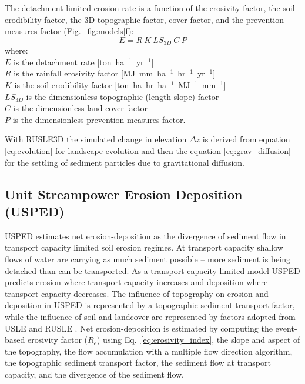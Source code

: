 \documentclass[gmd, manuscript]{copernicus}
\begin{document}
The detachment limited erosion rate is a function of the erosivity factor, 
the soil erodibility factor, the 3D topographic factor, 
cover factor, and the prevention measures factor 
(Fig.~\ref{fig:models}f):
%
\begin{equation}
\label{eq:rusle}
{E = R ~ K ~ LS_{3D} ~ C ~ P}
\end{equation}
%
{\small
\noindent
where: \\
\noindent
\hspace*{0.5em} $E$ is the detachment rate [\unit{ton}~\unit{ha}$^{-1}$~\unit{yr}$^{-1}$]\\
\hspace*{0.5em} $R$ is the rainfall erosivity factor [\unit{MJ~mm~ha}$^{-1}$~\unit{hr}$^{-1}$~\unit{yr}$^{-1}$]\\
\hspace*{0.5em} $K$ is the soil erodibility factor [\unit{ton~ha~hr~ha}$^{-1}$~\unit{MJ}$^{-1}$~\unit{mm}$^{-1}$]\\
\hspace*{0.5em} $LS_{3D}$ is the dimensionless topographic (length-slope) factor\\
\hspace*{0.5em} $C$ is the dimensionless land cover factor\\
\hspace*{0.5em} $P$ is the dimensionless prevention measures factor.\\
}

\noindent
With RUSLE3D the simulated change in elevation 
$\Delta z$
is derived from equation \ref{eq:evolution}
for landscape evolution and then the equation \ref{eq:grav_diffusion}
for the settling of sediment particles due to gravitational diffusion.


\subsection{Unit Streampower Erosion Deposition (USPED)} \label{usped_model}
USPED estimates net erosion-deposition as the divergence of sediment flow
in transport capacity limited soil erosion regimes.
At transport capacity 
shallow flows of water are carrying as much sediment possible 
-- more sediment is being detached 
than can be transported.
As a transport capacity limited model
USPED predicts erosion where transport capacity increases
and deposition where transport capacity decreases. 
The influence of topography on erosion and deposition in USPED 
is represented by a topographic sediment transport factor,
while the influence of soil and landcover are represented by 
factors adopted from USLE and RUSLE
\citep{Mitasova1996}.
%
Net erosion-deposition is estimated by computing
the event-based erosivity factor ($R_e$) 
using Eq.~\ref{eq:erosivity_index},
the slope and aspect of the topography,
the flow accumulation with a multiple flow direction algorithm,
the topographic sediment transport factor,
the sediment flow at transport capacity,
and the divergence of the sediment flow. 
\end{document}
